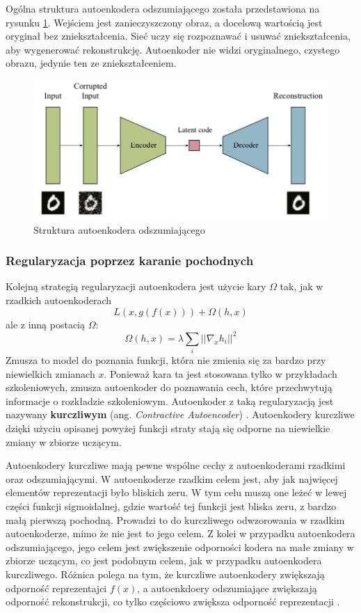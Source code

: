 \documentclass[12pt]{mwbk}
\theoremstyle{plain}
\theoremstyle{definition}
\theoremstyle{remark}
\begin{document}
Ogólna struktura autoenkodera odszumiającego została przedstawiona na rysunku \ref{fig:denoising-structure}. Wejściem jest zanieczyszczony obraz, a docelową wartością jest oryginał bez zniekształcenia. Sieć uczy się rozpoznawać i usuwać zniekształcenia, aby wygenerować rekonstrukcję. Autoenkoder nie widzi oryginalnego, czystego obrazu, jedynie ten ze zniekształceniem. 

\begin{figure}[!h]
	\centering
	\includegraphics[width=\linewidth]{rys/denoising_autoencoder.png}
	\caption{Struktura autoenkodera odszumiającego}
	\label{fig:denoising-structure}
\end{figure}




\subsubsection{Regularyzacja poprzez karanie pochodnych}

Kolejną strategią regularyzacji autoenkodera jest użycie kary $\Omega$ tak, jak w rzadkich autoenkoderach
$$L(x, g(f(x)))+\Omega(h,x)$$
ale z inną postacią $\Omega$:
$$\Omega(h, x)=\lambda \sum_i ||\nabla_x h_i ||^2$$
Zmusza to model do poznania funkcji, która nie zmienia się za bardzo przy niewielkich zmianach $x$. Ponieważ kara ta jest stosowana tylko w przykładach szkoleniowych, zmusza autoenkoder do poznawania cech, które przechwytują informacje o rozkładzie szkoleniowym. Autoenkoder z taką regularyzacją jest nazywany \textbf{kurczliwym} (ang. \emph{Contractive Autoencoder}) \cite{goodfellow}. Autoenkodery kurczliwe dzięki użyciu opisanej powyżej funkcji straty stają się odporne na niewielkie zmiany w zbiorze uczącym.

Autoenkodery kurczliwe mają pewne wspólne cechy z autoenkoderami rzadkimi oraz odszumiającymi. W autoenkoderze rzadkim celem jest, aby jak najwięcej elementów reprezentacji było bliskich zeru. W tym celu muszą one leżeć w lewej części funkcji sigmoidalnej, gdzie wartość tej funkcji jest bliska zeru, z bardzo małą pierwszą pochodną. Prowadzi to do kurczliwego odwzorowania w rzadkim autoenkoderze, mimo że nie jest to jego celem. Z kolei w przypadku autoenkodera odszumiającego, jego celem jest zwiększenie odporności kodera na małe zmiany w zbiorze uczącym, co jest podobnym celem, jak w przypadku autoenkodera kurczliwego. Różnica polega na tym, że kurczliwe autoenkodery zwiększają odporność reprezentajci $f(x)$, a autoenkdoery odszumiające zwiększają odporność rekonstrukcji, co tylko częściowo zwiększa odporność reprezentacji \cite{geeks}. 
\end{document}
